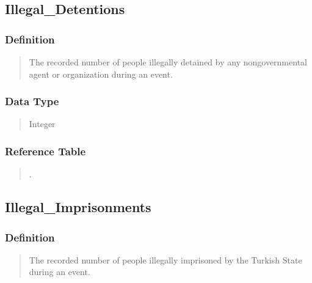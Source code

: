 \documentclass[letterpaper,10pt,english]{sphinxmanual}
\begin{document}
\subsection{Illegal\_Detentions}
\label{\detokenize{database_schema:illegal-detentions}}

\subsubsection{Definition}
\label{\detokenize{database_schema:id61}}\begin{quote}

\sphinxAtStartPar
The recorded number of people illegally detained by any non\sphinxhyphen{}governmental agent or organization during an event.
\end{quote}


\subsubsection{Data Type}
\label{\detokenize{database_schema:id62}}\begin{quote}

\sphinxAtStartPar
Integer
\end{quote}


\subsubsection{Reference Table}
\label{\detokenize{database_schema:id63}}\begin{quote}

\sphinxAtStartPar
{\hyperref[\detokenize{database_schema:overview-table}]{}}.
\end{quote}


\subsection{Illegal\_Imprisonments}
\label{\detokenize{database_schema:illegal-imprisonments}}

\subsubsection{Definition}
\label{\detokenize{database_schema:id64}}\begin{quote}

\sphinxAtStartPar
The recorded number of people illegally imprisoned by the Turkish State during an event.
\end{quote}
\end{document}
